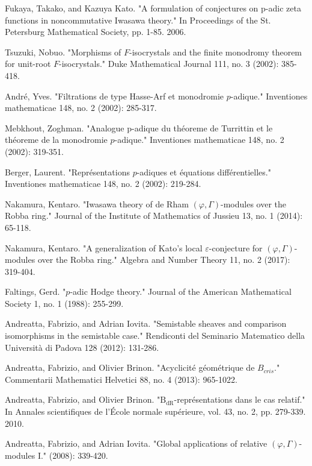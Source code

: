 \documentclass[12pt]{amsart}
\theoremstyle{definition}
\numberwithin{equation}{section}
\begin{document}
\begin{thebibliography}{10}
 Fukaya, Takako, and Kazuya Kato. "A formulation of conjectures on p-adic zeta functions in noncommutative Iwasawa theory." In Proceedings of the St. Petersburg Mathematical Society, pp. 1-85. 2006.

 Tsuzuki, Nobuo. "Morphisms of $F$-isocrystals and the finite monodromy theorem for unit-root $F$-isocrystals." Duke Mathematical Journal 111, no. 3 (2002): 385-418.

 Andr\'e, Yves. "Filtrations de type Hasse-Arf et monodromie $p$-adique." Inventiones mathematicae 148, no. 2 (2002): 285-317.

 Mebkhout, Zoghman. "Analogue p-adique du th\'eoreme de Turrittin et le th\'eoreme de la monodromie $p$-adique." Inventiones mathematicae 148, no. 2 (2002): 319-351.

  Berger, Laurent. "Repr\'esentations $p$-adiques et \'equations diff\'erentielles." Inventiones mathematicae 148, no. 2 (2002): 219-284. 

 Nakamura, Kentaro. "Iwasawa theory of de Rham $(\varphi,\Gamma) $-modules over the Robba ring." Journal of the Institute of Mathematics of Jussieu 13, no. 1 (2014): 65-118.

 Nakamura, Kentaro. "A generalization of Kato's local $\varepsilon$-conjecture for $(\varphi,\Gamma) $-modules over the Robba ring." Algebra and Number Theory 11, no. 2 (2017): 319-404.

 Faltings, Gerd. "$p$-adic Hodge theory." Journal of the American Mathematical Society 1, no. 1 (1988): 255-299.


 Andreatta, Fabrizio, and Adrian Iovita. "Semistable sheaves and comparison isomorphisms in the semistable case." Rendiconti del Seminario Matematico della Universit\`a di Padova 128 (2012): 131-286.


 Andreatta, Fabrizio, and Olivier Brinon. "Acyclicit\'e g\'eom\'etrique de $B_{cris}$." Commentarii Mathematici Helvetici 88, no. 4 (2013): 965-1022.


 Andreatta, Fabrizio, and Olivier Brinon. "$\mathrm {B}_{\mathrm{dR}}$-repr\'esentations dans le cas relatif." In Annales scientifiques de l'\'Ecole normale sup\'erieure, vol. 43, no. 2, pp. 279-339. 2010.

 Andreatta, Fabrizio, and Adrian Iovita. "Global applications of relative $(\varphi, \Gamma)$-modules I." (2008): 339-420.


\end{thebibliography}
\end{document}
